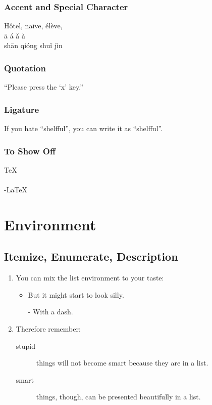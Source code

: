 \documentclass[12pt]{article}
\begin{document}
\subsubsection{Accent and Special Character}
H\^otel, na\"\i ve, \'el\`eve,\\
\= a \' a \v a \` a \\
sh\= an qi\' ong shu\v i j\`in

\subsubsection{Quotation}
``Please press the `x' key.''

\subsubsection{Ligature}
If you hate ``shelfful'', you can write it as ``shelf\mbox{}ful''.

\subsubsection{To Show Off}
\TeX \\
\LaTeXe \\
\AmS-\LaTeX \\

\section{Environment}
\subsection{Itemize, Enumerate, Description}
\begin{enumerate}
\item You can mix the list environment to your taste:
  \begin{itemize}
  \item But it might start to look silly.
  \item[-] With a dash.
  \end{itemize}
\item Therefore remember:
  \begin{description}
  \item[stupid] things will not become smart because they are in a list.
  \item[smart] things, though, can be presented beautifully in a list.
  \end{description}
\end{enumerate}
\end{document}
